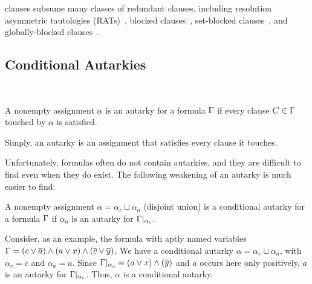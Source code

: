 


\pr clauses subsume many classes of redundant clauses, including resolution
asymmetric tautologies (RATs)~\cite{rat}, blocked clauses~\cite{blockedclause},
set-blocked clauses~\cite{setblocked}, and globally-blocked
clauses~\cite{conditionalautarkies}.

\subsection{Conditional Autarkies}~\label{subsec:autarkies}


\begin{definition}
    A nonempty assignment $\alpha$ is an autarky for a formula $\Gamma$ if
    every clause $C \in \Gamma$ touched by $\alpha$ is satisfied.
\end{definition}


Simply, an autarky is an assignment that satisfies every clause it
touches.

Unfortunately, formulas often do not contain autarkies, and they are difficult
to find even when they do exist. The following weakening of an autarky is much
easier to find: 

\begin{definition}
    A nonempty assignment $\alpha = \alpha_c \sqcup \alpha_a$ (disjoint union)
    is a conditional autarky for a formula $\Gamma$ if $\alpha_a$ is an
    autarky for $\Gamma|_{\alpha_c}$.
\end{definition}

Consider, as an example, the formula with aptly named variables $\Gamma = (c
\lor \overline{a}) \land (a \lor x) \land (\overline{c} \lor
\overline{y})$. We have a conditional autarky $\alpha = \alpha_c \sqcup
\alpha_a$, with $\alpha_c = c$ and $\alpha_a = a$. Since $\Gamma|_{\alpha_c} =
(a \lor x) \land (\overline{y})$ and $a$ occurs here only positively, $a$
is an autarky for $\Gamma|_{\alpha_c}$. Thus, $\alpha$ is a conditional autarky.

